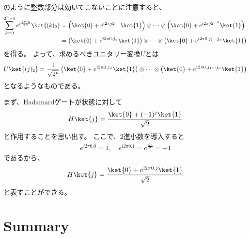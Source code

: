 \documentclass[]{ltjsarticle}
\begin{document}
のように整数部分は効いてこないことに注意すると、
\begin{align}
    \sum_{k=0}^{2^n-1}
    e^{i\frac{2\pi jk}{2^n}}
    \ket{(k)_2}    
    &=
    \left(
        \ket{0} 
        + 
        e^{i2\pi j 2^{-1}} \ket{1}
    \right)
    \otimes 
    \cdots 
    \otimes 
    \left(
        \ket{0} 
        + 
        e^{i2\pi j 2^{-n}} \ket{1}
    \right) \\
    &=
    \left(
        \ket{0} 
        + 
        e^{i2\pi 0.j_n} \ket{1}
    \right)
    \otimes 
    \cdots 
    \otimes 
    \left(
        \ket{0} 
        + 
        e^{i2\pi 0.j_1 \cdots j_n} \ket{1}
    \right)
\end{align}
を得る。
よって、求めるべきユニタリー変換$U$とは
\begin{align}
    U \ket{(j)_2}
    =
    \frac{1}{\sqrt{2^n}}
    \left(
        \ket{0} 
        + 
        e^{i2\pi 0.j_n} \ket{1}
    \right)
    \otimes 
    \cdots 
    \otimes 
    \left(
        \ket{0} 
        + 
        e^{i2\pi 0.j_1 \cdots j_n} \ket{1}
    \right)
\end{align}
となるようなものである。

まず、Hadamardゲートが状態に対して
\begin{align}
    H \ket{j} 
    = \frac{\ket{0} + (-1)^{j}\ket{1}}{\sqrt{2}}
\end{align}
と作用することを思い出す。
ここで、2進小数を導入すると
\begin{align}
    e^{i 2\pi 0.0} = 1, \quad 
    e^{i 2\pi 0.1} = e^{\frac{i 2\pi}{2}} = -1
\end{align}
であるから、
\begin{align}
    H \ket{j} 
    = \frac{\ket{0} + e^{i 2\pi 0.j}\ket{1}}{\sqrt{2}}
\end{align}
と表すことができる。




\section{Summary}


%
%
\end{document}
